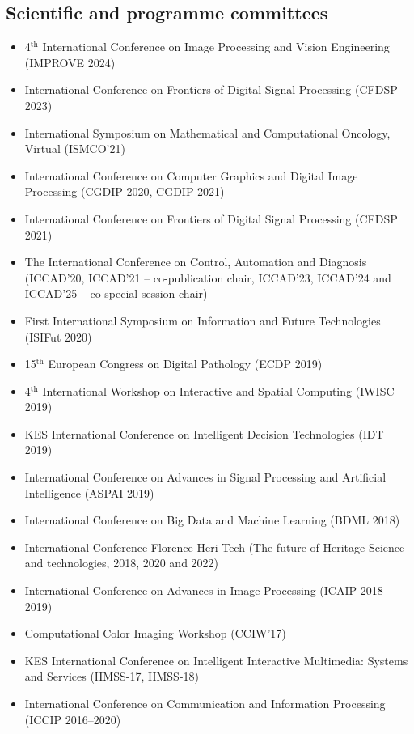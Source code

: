 \documentclass[11pt]{article}
\begin{document}
\subsection*{Scientific and programme committees}

\begin{itemize} 
	\item 4$^\text{th}$ International Conference on Image Processing and Vision Engineering (IMPROVE 2024)
	\item International Conference on Frontiers of Digital Signal Processing (CFDSP 2023)
	\item International Symposium on Mathematical and Computational Oncology, Virtual (ISMCO'21)
	\item International Conference on Computer Graphics and Digital Image Processing (CGDIP 2020, CGDIP 2021)
	\item International Conference on Frontiers of Digital Signal Processing (CFDSP 2021)
  \item The International Conference on Control, Automation and Diagnosis (ICCAD'20, ICCAD'21 -- co-publication chair, ICCAD'23, ICCAD'24 and ICCAD'25 -- co-special session chair)
  \item First International Symposium on Information and Future Technologies (ISIFut 2020)
  \item 15$^\text{th}$ European Congress on Digital Pathology (ECDP 2019)
	\item 4$^\text{th}$ International Workshop on Interactive and Spatial Computing (IWISC 2019)
  \item KES International Conference on Intelligent Decision Technologies (IDT 2019)
  \item International Conference on Advances in Signal Processing and Artificial Intelligence (ASPAI 2019)
  \item International Conference on Big Data and Machine Learning (BDML 2018)
  \item International Conference Florence Heri-Tech (The future of Heritage Science and technologies, 2018, 2020 and 2022)
  \item International Conference on Advances in Image Processing (ICAIP 2018--2019)
  \item Computational Color Imaging Workshop (CCIW'17)
	\item KES International Conference on Intelligent Interactive Multimedia: Systems and Services (IIMSS-17, IIMSS-18)
  \item International Conference on Communication and Information Processing (ICCIP 2016--2020)

\end{itemize}
\end{document}
